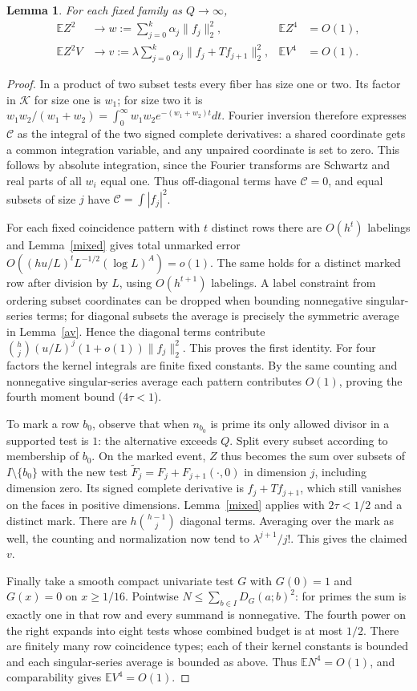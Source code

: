 \documentclass[11pt]{article}
\newtheorem{lemma}[theorem]{Lemma}
\newcommand{\E}{\mathbb E}
\begin{document}
\begin{lemma}\label{forms}
For each fixed family as $Q\to\infty$,
\begin{align*}
 \E Z^2&\to w:=\sum_{j=0}^k\alpha_j\|f_j\|_2^2,&
 \E Z^4&=O(1),\\
 \E Z^2 V&\to v:=\lambda\sum_{j=0}^k\alpha_j
       \|f_j+Tf_{j+1}\|_2^2,& \E V^4&=O(1).
\end{align*}
\end{lemma}
\begin{proof}
In a product of two subset tests every fiber has size one or two.
Its factor in $\mathcal K$ for size one is $w_1$; for size two it is
$w_1w_2/(w_1+w_2)=\int_0^\infty w_1w_2 e^{-(w_1+w_2)t}dt$.
Fourier inversion therefore expresses $\mathcal C$ as the integral
of the two signed complete derivatives: a shared coordinate gets
a common integration variable, and any unpaired coordinate is set to zero.
This follows by absolute integration, since the Fourier transforms are
Schwartz and real parts of all $w_i$ equal one. Thus off-diagonal terms
have $\mathcal C=0$, and equal subsets of size $j$ have
$\mathcal C=\int |f_j|^2$.

For each fixed coincidence pattern with $t$ distinct rows there are
$O(h^t)$ labelings and Lemma~\ref{mixed} gives total unmarked error
$O((hu/L)^t L^{-1/2}(\log L)^A)=o(1)$. The same holds for a distinct
marked row after division by $L$, using $O(h^{t+1})$ labelings.
A label constraint from ordering subset coordinates can be dropped
when bounding nonnegative singular-series terms; for diagonal subsets
the average is precisely the symmetric average in Lemma~\ref{av}.
Hence the diagonal terms contribute
$\binom hj(u/L)^j(1+o(1))\|f_j\|_2^2$.
This proves the first identity. For four factors the kernel integrals
are finite fixed constants. By the same counting and nonnegative
singular-series average each pattern contributes $O(1)$, proving the
fourth moment bound ($4\tau<1$).

To mark a row $b_0$, observe that when $n_{b_0}$ is prime its only
allowed divisor in a supported test is $1$: the alternative exceeds
$Q$. Split every subset according to membership of $b_0$. On the
marked event, $Z$ thus becomes the sum over subsets of
$I\setminus\{b_0\}$ with the new test
$\widetilde F_j=F_j+F_{j+1}(\cdot,0)$ in dimension $j$, including
dimension zero. Its signed complete derivative is $f_j+Tf_{j+1}$,
which still vanishes on the faces in positive dimensions.
Lemma~\ref{mixed} applies with $2\tau<1/2$ and a distinct mark.
There are $h\binom{h-1}{j}$ diagonal terms. Averaging over the mark
as well, the counting and normalization now tend to
$\lambda^{j+1}/j!$. This gives the claimed $v$.

Finally take a smooth compact univariate test $G$ with $G(0)=1$
and $G(x)=0$ on $x\ge1/16$. Pointwise
$N\le\sum_{b\in I}D_G(a;b)^2$: for primes the sum is exactly one
in that row and every summand is nonnegative. The fourth power on the
right expands into eight tests whose combined budget is at most $1/2$.
There are finitely many row coincidence types; each of their kernel
constants is bounded and each singular-series average is bounded
as above. Thus $\E N^4=O(1)$, and comparability gives $\E V^4=O(1)$.
\end{proof}
\end{document}
